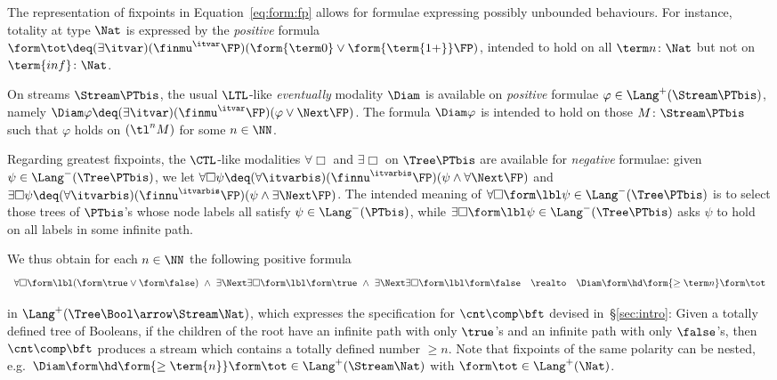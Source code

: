 \begin{example}
\label{ex:form:fix}
The representation of fixpoints in Equation~\eqref{eq:form:fp}
allows for formulae expressing possibly unbounded behaviours.
For instance, totality at type $\Nat$ is expressed by the \emph{positive} formula
\(
  \form\tot
  \deq
  (\exists \itvar)(\finmu^\itvar \FP)(\form{\term 0} \lor \form{\term{1+}}\FP)
\),
intended to hold
on all $\term n \colon \Nat$ but not on $\term{inf} \colon \Nat$.

On streams $\Stream \PTbis$, the usual $\LTL$-like
\emph{eventually}
modality $\Diam$
is available on \emph{positive} formulae $\varphi \in \Lang^+(\Stream\PTbis)$,
namely
$\Diam \varphi \deq (\exists \itvar)(\finmu^\itvar \FP)(\varphi \lor \Next\FP)$.
The formula $\Diam \varphi$ is intended to hold on those $M \colon \Stream\PTbis$
such that $\varphi$ holds on $(\tl^n M)$ for some $n \in \NN$.

Regarding greatest fixpoints, the $\CTL$-like modalities
$\forall\Box$ and $\exists\Box$ on $\Tree \PTbis$ 
are available for \emph{negative} formulae: given $\psi \in \Lang^-(\Tree\PTbis)$,
we let
\(
  \forall \Box \psi
  \deq
  (\forall \itvarbis)(\finnu^\itvarbis \FP)(\psi \land \forall\Next \FP)
\)
and
\(
  \exists \Box \psi
  \deq
  (\forall \itvarbis)(\finnu^\itvarbis \FP)(\psi \land \exists\Next \FP)
\).
The intended meaning of $\forall\Box\form\lbl\psi \in \Lang^-(\Tree\PTbis)$
is to select those trees of $\PTbis$'s whose node labels all satisfy
$\psi \in \Lang^-(\PTbis)$,
while $\exists\Box\form\lbl\psi \in \Lang^-(\Tree\PTbis)$
asks $\psi$ to hold on all labels in some infinite path.

We thus obtain for each $n \in \NN$
the following positive formula 
\begin{equation}
\label{eq:form:spec}
\begin{array}{l l l}
  \forall\Box\form\lbl(\form\true \lor \form\false)
  ~\land~
  \exists\Next\exists\Box\form\lbl\form\true
  ~\land~
  \exists\Next\exists\Box\form\lbl\form\false
& \realto
& \Diam\form\hd \form{\geq \term n} \form\tot
\end{array}
\end{equation}

\noindent
in $\Lang^+(\Tree\Bool \arrow \Stream\Nat)$,
which expresses the specification for $\cnt \comp \bft$
devised in~\S\ref{sec:intro}:
Given a totally defined tree of Booleans,
if the children of the root have an infinite path with only $\true$'s
and an infinite path with only $\false$'s,
then $\cnt \comp \bft$ produces a stream which contains a totally
defined number $\geq n$.
%
Note that
fixpoints of the same polarity can be nested,
e.g.\
$\Diam\form\hd\form{\geq \term{n}}\form\tot \in \Lang^+(\Stream \Nat)$
with $\form\tot \in \Lang^+(\Nat)$.
\lipicsEnd
\end{example}

